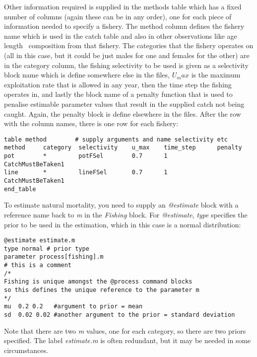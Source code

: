 Other information required is supplied in the methods table which has a fixed number of columns (again these can be in any order), one for each piece of information needed to specify a fishery. The method column defines the fishery name which is used in the catch table and also in other observations like \ifAgeBased age \else length \fi \ composition from that fishery. The categories that the fishery operates on (all in this case, but it could be just males for one and females for the other) are in the category column, the fishing selectivity to be used is given as a selectivity block name which is define somewhere else in the files, $U_max$ is the maximum exploitation rate that is allowed in any year, then the time step the fishing operates in, and lastly the block name of a penalty function that is used to penalise estimable parameter values that result in the supplied catch not being caught. Again, the penalty block is define elsewhere in the files. After the row with the column names, there is one row for each fishery:

{\small{\begin{verbatim}
table method        # supply arguments and name selectivity etc
method     category  selectivity    u_max    time_step      penalty
pot        *         potFSel        0.7      1              CatchMustBeTaken1
line       *         lineFSel       0.7      1              CatchMustBeTaken1
end_table
\end{verbatim}}}

To estimate natural mortality, you need to supply an \textit{@estimate} block with a reference name back to \textit{m} in the \textit{Fishing} block. For \textit{@estimate}, \textit{type} specifies the prior to be used in the estimation, which in this case is a normal distribution:

{\small{\begin{verbatim}
@estimate estimate.m
type normal # prior type
parameter process[fishing].m  
# this is a comment
/*
Fishing is unique amongst the @process command blocks
so this defines the unique reference to the parameter m
*/
mu  0.2 0.2   #argument to prior = mean
sd  0.02 0.02 #another argument to the prior = standard deviation
\end{verbatim}}}

Note that there are two \textit{m} values, one for each category, so there are two priors specified. The \textit{\@estimate} label \textit{estimate.m} is often redundant, but it may be needed in some circumstances.

